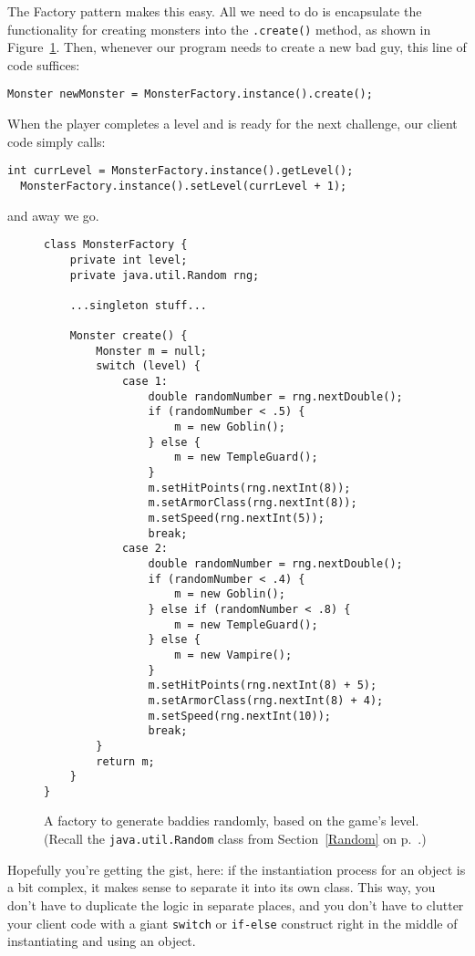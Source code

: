 The Factory pattern makes this easy. All we need to do is encapsulate the
functionality for creating monsters into the \texttt{.create()} method, as
shown in Figure~\ref{fig:monsterFactoryCode}. Then, whenever our program needs
to create a new bad guy, this line of code suffices:

\begin{Verbatim}[fontsize=\small,samepage=true,frame=none]
  Monster newMonster = MonsterFactory.instance().create();
\end{Verbatim}

When the player completes a level and is ready for the next challenge, our
client code simply calls:

\begin{Verbatim}[fontsize=\small,samepage=true,frame=none]
  int currLevel = MonsterFactory.instance().getLevel();
  MonsterFactory.instance().setLevel(currLevel + 1);
\end{Verbatim}

and away we go.

\begin{figure}
\begin{Verbatim}[fontsize=\footnotesize,samepage=true,frame=single]
class MonsterFactory {
    private int level;
    private java.util.Random rng;
    
    ...singleton stuff...

    Monster create() {
        Monster m = null;
        switch (level) {
            case 1:
                double randomNumber = rng.nextDouble();
                if (randomNumber < .5) {
                    m = new Goblin();
                } else {
                    m = new TempleGuard();
                }
                m.setHitPoints(rng.nextInt(8));
                m.setArmorClass(rng.nextInt(8));
                m.setSpeed(rng.nextInt(5));
                break;
            case 2:
                double randomNumber = rng.nextDouble();
                if (randomNumber < .4) {
                    m = new Goblin();
                } else if (randomNumber < .8) {
                    m = new TempleGuard();
                } else {
                    m = new Vampire();
                }
                m.setHitPoints(rng.nextInt(8) + 5);
                m.setArmorClass(rng.nextInt(8) + 4);
                m.setSpeed(rng.nextInt(10));
                break;
        }
        return m;
    }
}
\end{Verbatim}
\caption{A factory to generate baddies randomly, based on the game's level.
(Recall the \texttt{java.util.Random} class from Section~\ref{Random} on
p.~\pageref{Random}.)}
\label{fig:monsterFactoryCode}
\end{figure}

Hopefully you're getting the gist, here: if the instantiation process for an
object is a bit complex, it makes sense to separate it into its own class.
This way, you don't have to duplicate the logic in separate places, and you
don't have to clutter your client code with a giant \texttt{switch} or
\texttt{if-else} construct right in the middle of instantiating and using an
object.

